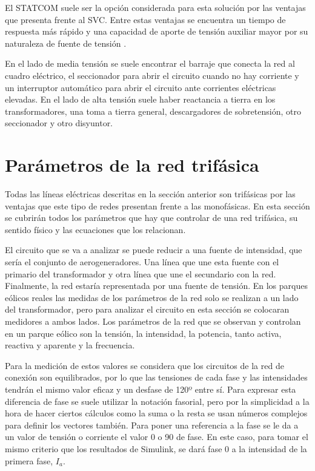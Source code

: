 \documentclass{book}
\begin{document}
El STATCOM suele ser la opci\'on considerada para esta soluci\'on por las ventajas que presenta frente al SVC. Entre estas ventajas se encuentra un tiempo de respuesta m\'as r\'apido y una capacidad de aporte de tensi\'on auxiliar mayor por su naturaleza de fuente de tensi\'on \cite{STATCOM}. \par

En el lado de media tensi\'on se suele encontrar el barraje que conecta la red al cuadro el\'ectrico, el seccionador para abrir el circuito cuando no hay corriente y un interruptor autom\'atico para abrir el circuito ante corrientes el\'ectricas elevadas. En el lado de alta tensi\'on suele haber reactancia a tierra en los transformadores, una toma a tierra general, descargadores de sobretensi\'on, otro seccionador y otro disyuntor.  \par


	\section{Par\'ametros de la red trif\'asica} 
	
	Todas las l\'ineas el\'ectricas descritas en la secci\'on anterior son trif\'asicas por las ventajas que este tipo de redes presentan frente a las monof\'asicas. En esta secci\'on se cubrir\'an todos los par\'ametros que hay que controlar de una red trif\'asica, su sentido f\'isico y las ecuaciones que los relacionan. \par

El circuito que se va a analizar se puede reducir a una fuente de intensidad, que ser\'ia el conjunto de aerogeneradores. Una l\'inea que une esta fuente con el primario del transformador y otra l\'inea que une el secundario con la red. Finalmente, la red estar\'ia representada por una fuente de tensi\'on. En los parques e\'olicos reales las medidas de los par\'ametros de la red solo se realizan a un lado del transformador, pero para analizar el circuito en esta secci\'on se colocaran medidores a ambos lados. Los par\'ametros de la red que se observan y controlan en un parque e\'olico son la tensi\'on, la intensidad, la potencia, tanto activa, reactiva y aparente y la frecuencia. \par

Para la medici\'on de estos valores se considera que los circuitos de la red de conexi\'on son equilibrados, por lo que las tensiones de cada fase y las intensidades tendr\'an el mismo valor eficaz y un desfase de 120º entre s\'i. Para expresar esta diferencia de fase se suele utilizar la notaci\'on fasorial,  pero por la simplicidad a la hora de hacer ciertos c\'alculos como la suma o la resta se usan n\'umeros complejos para definir los vectores tambi\'en. Para poner una referencia a la fase se le da a un valor de tensi\'on o corriente el valor 0 o 90 de fase. En este caso, para tomar el mismo criterio que los resultados de Simulink, se dar\'a fase 0 a la intensidad de la primera fase, $I_a$. \par
\end{document}
